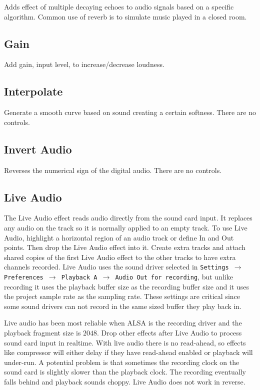 Adds effect of multiple decaying echoes to audio signals based on a specific algorithm. Common use of reverb is to simulate music played in a closed room.

\subsection{Gain}%
\label{sub:gain}

Add gain, input level, to increase/decrease loudness.

\subsection{Interpolate}%
\label{sub:interpolate}

Generate a smooth curve based on sound creating a certain softness. There are no controls.

\subsection{Invert Audio}%
\label{sub:invert_audio}

Reverses the numerical sign of the digital audio. There are no controls.

\subsection{Live Audio}%
\label{sub:live_audio}

The Live Audio effect reads audio directly from the sound card input. It replaces any audio on the track so it is normally applied to an empty track. To use Live Audio, highlight a horizontal region of an audio track or define In and Out points. Then drop the Live Audio effect into it. Create extra tracks and attach shared copies of the first Live Audio effect to the other tracks to have extra channels recorded. Live Audio uses the sound driver selected in \texttt{Settings $\rightarrow$ Preferences $\rightarrow$ Playback A $\rightarrow$ Audio Out for recording}, but unlike recording it uses the playback buffer size as the recording buffer size and it uses the project sample rate as the sampling rate. These settings are critical since some sound drivers can not record in the same sized buffer they play back in.

Live audio has been most reliable when ALSA is the recording driver and the playback fragment size is $2048$. Drop other effects after Live Audio to process sound card input in realtime. With live audio there is no read-ahead, so effects like compressor will either delay if they have read-ahead enabled or playback will under-run. A potential problem is that sometimes the recording clock on the sound card is slightly slower than the playback clock. The recording eventually falls behind and playback sounds choppy. Live Audio does not work in reverse.

